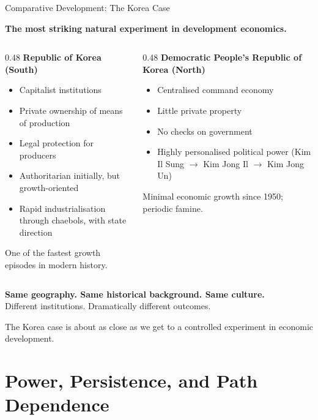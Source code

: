 \documentclass[10pt]{beamer}
\begin{document}
\begin{frame}[allowframebreaks]{Comparative Development: The Korea Case}

\textbf{The most striking natural experiment in development economics.}


\begin{columns}[T]
\begin{column}{0.48\textwidth}
\textbf{\color{myTeal} Republic of Korea (South)}\\[6pt]
\begin{itemize}
\item Capitalist institutions
\item Private ownership of means of production
\item Legal protection for producers
\item Authoritarian initially, but growth-oriented
\item Rapid industrialisation through chaebols, with state direction
\end{itemize}
\vspace{4pt}
\footnotesize \alert{One of the fastest growth episodes in modern history.}
\end{column}
\begin{column}{0.48\textwidth}
\textbf{\color{myOrange} Democratic People's Republic of Korea (North)}\\[6pt]
\begin{itemize}
\item Centralised command economy
\item Little private property
\item No checks on government
\item Highly personalised political power (Kim Il Sung $\to$ Kim Jong Il $\to$ Kim Jong Un)
\end{itemize}
\vspace{4pt}
\footnotesize \alert{Minimal economic growth since 1950; periodic famine.}
\end{column}
\end{columns}


\textbf{Same geography. Same historical background. Same culture.}\\
Different institutions. Dramatically different outcomes.


\alert{The Korea case is about as close as we get to a controlled experiment in economic development.}
\end{frame}


\section{Power, Persistence, and Path Dependence}
\end{document}
